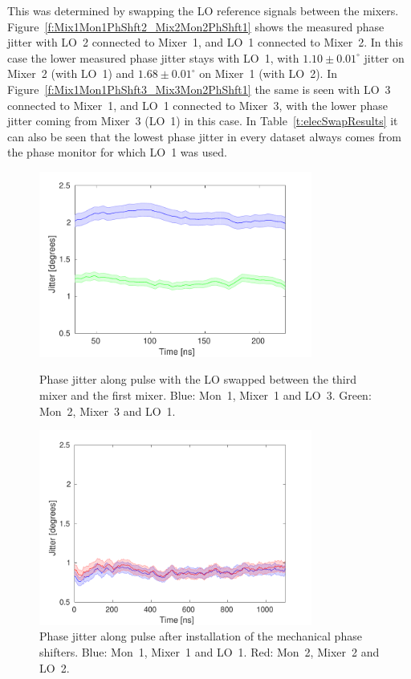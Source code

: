 This was determined by swapping the LO reference signals between the mixers. Figure~\ref{f:Mix1Mon1PhShft2_Mix2Mon2PhShft1} shows the measured phase jitter with LO~2 connected to Mixer~1, and LO~1 connected to Mixer~2. In this case the lower measured phase jitter stays with LO~1, with \(1.10\pm0.01^\circ\) jitter on Mixer~2 (with LO~1) and \(1.68\pm0.01^\circ\) on Mixer~1 (with LO~2). In Figure~\ref{f:Mix1Mon1PhShft3_Mix3Mon2PhShft1} the same is seen with LO~3 connected to Mixer~1, and LO~1 connected to Mixer~3, with the lower phase jitter coming from Mixer~3 (LO~1) in this case. In Table~\ref{t:elecSwapResults} it can also be seen that the lowest phase jitter in every dataset always comes from the phase monitor for which LO~1 was used.

\begin{figure}
  \centering
  \includegraphics[width=0.8\textwidth]{Figures/phaseMons/Mix1Mon1PhShft3_Mix3Mon2PhShft1}
  \caption{Phase jitter along pulse with the LO swapped between the third mixer and the first mixer. Blue: Mon~1, Mixer~1 and LO~3. Green: Mon~2, Mixer~3 and LO~1.}
  \label{f:Mix1Mon1PhShft3_Mix3Mon2PhShft1}
  \includegraphics[width=0.8\textwidth]{Figures/phaseMons/jitterMechanicalShifters}
  \caption{Phase jitter along pulse after installation of the mechanical phase shifters. Blue: Mon~1, Mixer~1 and LO~1. Red: Mon~2, Mixer~2 and LO~2.}
  \label{f:jitterMechanicalShifters}
\end{figure}

